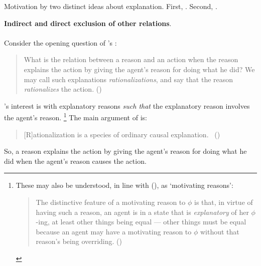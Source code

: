 \begin{note}
  Motivation by two distinct ideas about explanation.
  First, .
  Second, .
\end{note}


\begin{note}
  \textbf{Indirect and direct exclusion of other relations}.
\end{note}

\paragraph*{}

\begin{note}
  Consider the opening question of \citeauthor{Davidson:1963aa}'s :
  \begin{quote}
    What is the relation between a reason and an action when the reason explains the action by giving the agent's reason for doing what he did?
    We may call such explanations \emph{rationalizations}, and say that the reason \emph{rationalizes} the action.%
    \mbox{}\hfill\mbox{(\citeyear[685]{Davidson:1963aa})}
  \end{quote}
  \citeauthor{Davidson:1963aa}'s interest is with explanatory reasons \emph{such that} the explanatory reason involves the agent's reason.%
  \footnote{
    These may also be understood, in line with \citeauthor{Smith:1994wo} (\citeyear{Smith:1994wo}), as `motivating reasons':
    \begin{quote}
      The distinctive feature of a motivating reason to \(\phi\) is that, in virtue of having such a reason, an agent is in a state that is \emph{explanatory} of her \(\phi\)-ing, at least other things being equal --- other things must be equal because an agent may have a motivating reason to \(\phi\) without that reason's being overriding.%
      \mbox{}\hfill\mbox{(\citeyear[96]{Smith:1994wo})}
    \end{quote}
  }
  The main argument of  is:
  \begin{quote}
    [R]ationalization is a species of ordinary causal explanation.%
    \mbox{ }\hfill\mbox{(\citeyear[685]{Davidson:1963aa})}
  \end{quote}
  So, a reason explains the action by giving the agent's reason for doing what he did when the agent's reason causes the action.
\end{note}

